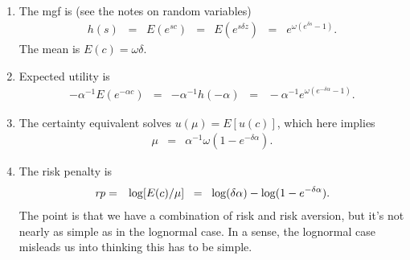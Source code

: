 \documentclass[11pt]{article}
\begin{document}
\begin{enumerate}
\begin{enumerate}
\item The mgf is (see the notes on random variables)
\begin{eqnarray*}
    h(s) \;\;=\;\;  E(e^{sc}) &=& E(e^{s\delta z}) \;\;=\;\;  e^{\omega (e^{\delta s} -1)} .
\end{eqnarray*}
The mean is $ E(c) = \omega\delta $.

\item Expected utility is
\begin{eqnarray*}
 - \alpha^{-1} E(e^{-\alpha c}) &=& - \alpha^{-1} h(-\alpha)
            \;\;=\;\; - \alpha^{-1} e^{\omega (e^{-\delta\alpha } -1)} .
\end{eqnarray*}

\item The certainty equivalent solves $u(\mu) = E[u(c)]$, which here implies
\begin{eqnarray*}
    \mu &=& \alpha^{-1} \omega (1- e^{-\delta \alpha}) .
\end{eqnarray*}

\item The risk penalty is
\begin{eqnarray*}
    \mbox{\em rp\/} &=& \log [E(c)/\mu]
            \;\;=\;\; \log (\delta \alpha) - \log (1- e^{-\delta \alpha}) .
\end{eqnarray*}
The point is that we have a combination of risk and risk aversion,
but it's not nearly as simple as in the lognormal case.
In a sense, the lognormal case misleads us into thinking this has to be simple.
\end{enumerate}


\end{enumerate}



\end{document}
